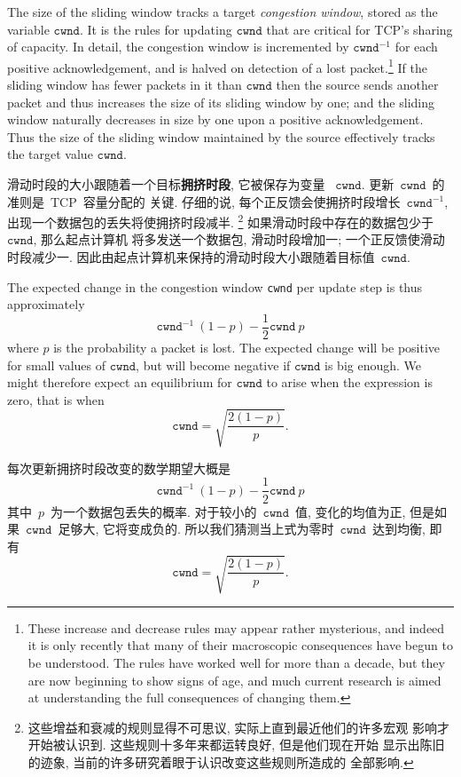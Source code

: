 \documentclass[a4paper,12pt, twocolumn]{article}
\begin{document}
The size of the sliding 
window tracks a target {\it congestion window}, stored as 
the variable $\texttt{cwnd}$. It is the rules for
updating $\texttt{cwnd}$ that are critical for TCP's 
sharing of capacity.
In detail, the congestion window 
is incremented by $\texttt{cwnd}^{-1}$ for each positive
acknowledgement, and is halved on detection of a lost 
packet.\footnote{These 
increase and decrease rules may appear rather mysterious,
and indeed it is only recently that many of their macroscopic
consequences have begun to be understood. 
The rules have worked well for more than a decade, but they are now 
beginning to show signs of age, and much current research
is aimed at understanding the full consequences of changing them.}
If the sliding window has fewer packets in it than 
$\texttt{cwnd}$ then the source sends another packet
and thus increases the size of its sliding window by one; and
the sliding window naturally decreases in size by one upon a 
positive acknowledgement. Thus 
the size of the sliding window maintained by the source effectively 
tracks the target value $\texttt{cwnd}$. 

滑动时段的大小跟随着一个目标\textbf{拥挤时段}, 它被保存为变量
~$\texttt{cwnd}$. 更新~$\texttt{cwnd}$~的准则是~TCP~容量分配的
关键. 仔细的说, 每个正反馈会使拥挤时段增长~$\texttt{cwnd}^{-1}$, 
出现一个数据包的丢失将使拥挤时段减半.
\footnote{
这些增益和衰减的规则显得不可思议, 实际上直到最近他们的许多宏观
影响才开始被认识到. 这些规则十多年来都运转良好, 但是他们现在开始
显示出陈旧的迹象, 当前的许多研究着眼于认识改变这些规则所造成的
全部影响. }
如果滑动时段中存在的数据包少于~$\texttt{cwnd}$, 那么起点计算机
将多发送一个数据包, 滑动时段增加一; 一个正反馈使滑动时段减少一. 
因此由起点计算机来保持的滑动时段大小跟随着目标值~$\texttt{cwnd}$. 

The expected change in the 
congestion window \texttt{cwnd} per update step is thus approximately
\[
  \texttt{cwnd}^{-1} \ (1-p)  -  \frac{1}{2} \texttt{cwnd}  \ p
 \]
where $p$ is the probability a packet is lost.
The expected change will be positive for small values of
$\texttt{cwnd}$, but will become negative if $\texttt{cwnd}$
is big enough. We might therefore expect an equilibrium
for $\texttt{cwnd}$ to arise when the expression is zero,
that is when
\[
  \texttt{cwnd} = \sqrt{\frac{2(1-p)}{p} }.
\]

每次更新拥挤时段改变的数学期望大概是
\[
  \texttt{cwnd}^{-1} \ (1-p)  -  \frac{1}{2} \texttt{cwnd}  \ p
 \]
 其中~$p$~为一个数据包丢失的概率. 对于较小的~$\texttt{cwnd}$~值, 
 变化的均值为正, 但是如果~$\texttt{cwnd}$~足够大, 它将变成负的. 
 所以我们猜测当上式为零时~$\texttt{cwnd}$~达到均衡, 即有
 \[
  \texttt{cwnd} = \sqrt{\frac{2(1-p)}{p} }.
\]
\end{document}
